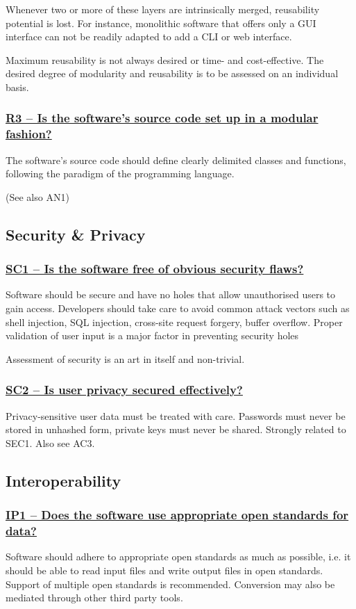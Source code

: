 \documentclass[a4paper,11pt]{article}
\newcommand{\indicator}[1]{\subsubsection*{\underline{#1}}}
\begin{document}
Whenever two or more of these layers are intrinsically merged, reusability potential is lost.
For instance, monolithic software that offers only a GUI interface can not be
readily adapted to add a CLI or web interface.

Maximum reusability is not always desired or time- and cost-effective. The
desired degree of modularity and reusability is to be assessed on an
individual basis.

\indicator{R3 -- Is the software's source code set up in a modular fashion?}
%
%
%

The software's source code should define clearly delimited classes and
functions, following the paradigm of the programming language. 

(See also AN1)

\subsection{Security \& Privacy}

\indicator{SC1 -- Is the software free of obvious security flaws?}

Software should be secure and have no holes that allow unauthorised users to
gain access. Developers should take care to avoid common attack vectors such as
shell injection, SQL injection, cross-site request forgery, buffer overflow.
Proper validation of user input is a major factor in preventing security holes

Assessment of security is an art in itself and non-trivial. 

\indicator{SC2 -- Is user privacy secured effectively?}

Privacy-sensitive user data must be treated with care. Passwords must never be
stored in unhashed form, private keys must never be shared. Strongly related to
SEC1. Also see AC3.

\subsection{Interoperability}

\indicator{IP1 -- Does the software use appropriate open standards for data?}

Software should adhere to appropriate open standards as much as possible, i.e.
it should be able to read input files and write output files in open
standards. Support of multiple open standards is recommended. Conversion may
also be mediated through other third party tools.
\end{document}
